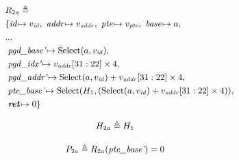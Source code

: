 \begin{equation}
\label{state_2a}
\small
\begin{aligned}
& R_{2a} \triangleq \\
&\{
        \textit{id}\!\mapsto v_{\mathit{id}},\
        \textit{addr}\!\mapsto v_{\mathit{addr}},\
        \textit{pte}\!\mapsto v_{\mathit{pte}},\
        \textit{base}\!\mapsto a,\\
      &...\\
      &\ \textit{pgd\_base'}\!\mapsto \text{Select}(a, v_{\mathit{id}}),\\
      &\ \textit{pgd\_idx'}\!\mapsto v_{\mathit{addr}}[31:22]  \times 4,\\
      &\ \textit{pgd\_addr'}\!\mapsto \text{Select}(a, v_{\mathit{id}}) + v_{\mathit{addr}}[31:22] \times 4,\\
      &\ \textit{pte\_base'}\!\mapsto \text{Select}(H_1, (\text{Select}(a, v_{\mathit{id}}) + v_{\mathit{addr}}[31:22] \times 4)),\\
      &\ \textit{\textbf{ret}}\!\mapsto 0\}
\end{aligned}
\end{equation}

\begin{equation}
\small
\begin{aligned}
& H_{2a} \triangleq H_{1}
\end{aligned}
\end{equation}

\begin{equation}
\small
\begin{aligned}
& P_{2a} \triangleq R_{2a}(\textit{pte\_base'}) = 0
\end{aligned}
\end{equation}

